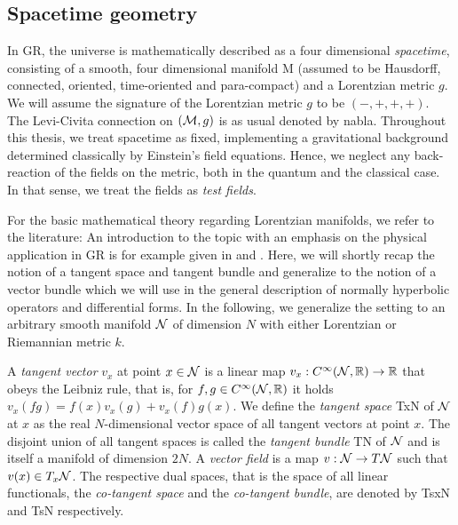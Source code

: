 \subsection{Spacetime geometry}\label{sec:spacetime_geometry}
In GR, the universe is mathematically described as a four dimensional \emph{spacetime}, consisting of a smooth, four dimensional manifold \gls{M} (assumed to be Hausdorff, connected, oriented, time-oriented and para-compact) and a Lorentzian metric $g$. We will assume the signature of the Lorentzian metric $g$ to be $(-,+,+,+)$. The Levi-Civita connection on $(\mathcal{M},g)$ is as usual denoted by \gls{nabla}.
Throughout this thesis, we treat spacetime as fixed, implementing a gravitational background determined classically by Einstein's field equations. Hence, we neglect any back-reaction of the fields on the metric, both in the quantum and the classical case. In that sense, we treat the fields as \emph{test fields}.\par
For the basic mathematical theory regarding Lorentzian manifolds, we refer to the literature: An introduction to the topic with an emphasis on the physical application in GR is for example given in \cite{wald_GR} and \cite{carroll_spacetime-and-gr}.
Here, we will shortly recap the notion of a tangent space and tangent bundle and generalize to the notion of a vector bundle which we will use in the general description of normally hyperbolic operators and differential forms.
In the following, we generalize the setting to an arbitrary smooth manifold $\mathcal{N}$ of dimension $N$ with either Lorentzian or Riemannian metric $k$.\par
%
%
A \emph{tangent vector} $v_x$ at point $x \in \mathcal{N}$ is a linear map $v_x : C^\infty(\mathcal{N} , \mathbb{R}) \to \mathbb{R}$ that obeys the Leibniz rule, that is, for $f,g \in C^\infty (\mathcal{N},\mathbb{R})$ it holds $v_x(fg) = f(x)v_x(g) + v_x(f)g(x)$.
We define the \emph{tangent space} \gls{TxN} of $\mathcal{N}$ at $x$ as the real $N$-dimensional vector space of all tangent vectors at point $x$.
The disjoint union of all tangent spaces is called the \emph{tangent bundle} \gls{TN} of $\mathcal{N}$ and is itself a manifold of dimension $2N$. A \emph{vector field} is a map $v: \mathcal{N} \to T\mathcal{N}$ such that $v(x) \in T_x\mathcal{N}$.
The respective dual spaces, that is the space of all linear functionals, the \emph{co-tangent space} and the \emph{co-tangent bundle}, are denoted by \gls{TsxN} and \gls{TsN} respectively.\par
%
